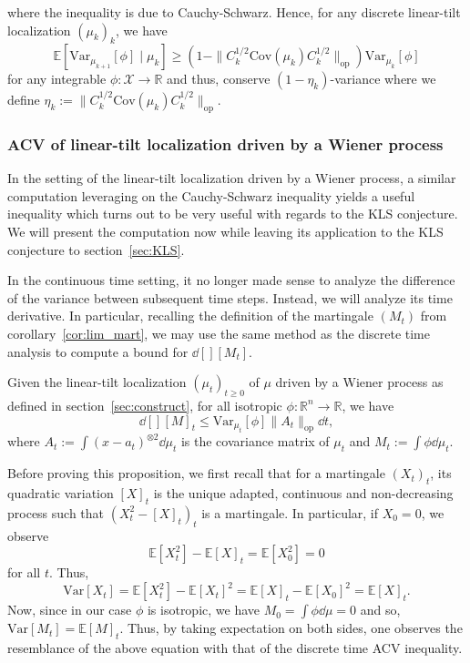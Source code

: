 where the inequality is due to Cauchy-Schwarz. Hence, for any discrete linear-tilt 
localization \((\mu_k)_k\), we have
\begin{equation}\label{eq:linear-tilt_ACV}
  \mathbb{E}[\text{Var}_{\mu_{k + 1}}[\phi] \mid \mu_k] \ge 
    (1 - \|C_k^{1 / 2}\text{Cov}(\mu_k)C_k^{1 / 2}\|_{\text{op}})\text{Var}_{\mu_k}[\phi]
\end{equation}
for any integrable \(\phi : \mathcal{X} \to \mathbb{R}\) and thus, conserve \((1 - \eta_k)\)-variance 
where we define \(\eta_k := \|C_k^{1 / 2}\text{Cov}(\mu_k)C_k^{1 / 2}\|_{\text{op}}\). 

\subsubsection{ACV of linear-tilt localization driven by a Wiener process}

In the setting of the linear-tilt localization driven by a Wiener process, a similar computation 
leveraging on the Cauchy-Schwarz inequality yields a useful inequality which turns out to be very 
useful with regards to the KLS conjecture. We will present the computation now while leaving its application to 
the KLS conjecture to section~\ref{sec:KLS}.

In the continuous time setting, it no longer made sense to analyze the difference of the variance 
between subsequent time steps. Instead, we will analyze its time derivative. In particular, recalling 
the definition of the martingale \((M_t)\) from corollary~\ref{cor:lim_mart}, we may use the same 
method as the discrete time analysis to compute a bound for \(\dd[] [M_t]\).

\begin{proposition}\label{prop:linear-tilt_ACV}
  Given the linear-tilt localization \((\mu_t)_{t \ge 0}\) of \(\mu\) driven by a Wiener process as defined 
  in section~\ref{sec:construct}, for all isotropic \(\phi : \mathbb{R}^n \to \mathbb{R}\), we have 
  \[\dd[] [M]_t \le \text{Var}_{\mu_t}[\phi] \|A_t\|_\text{op} \dd t,\]
  where \(A_t := \int (x - a_t)^{\otimes 2} \dd \mu_t\) is the covariance matrix of \(\mu_t\) and \(M_t := \int \phi \dd \mu_t\).
\end{proposition}

Before proving this proposition, we first recall that for a martingale \((X_t)_t\), its quadratic variation 
\([X]_t\) is the unique adapted, continuous and non-decreasing process such that \((X_t^2 - [X]_t)_t\) 
is a martingale. In particular, if \(X_0 = 0\), we observe 
\[\mathbb{E}[X_t^2] - \mathbb{E}[X]_t = \mathbb{E}[X_0^2] = 0\]
for all \(t\). Thus, 
\[\text{Var}[X_t] = \mathbb{E}[X_t^2] - \mathbb{E}[X_t]^2 = \mathbb{E}[X]_t - \mathbb{E}[X_0]^2 = \mathbb{E}[X]_t.\]
Now, since in our case \(\phi\) is isotropic, we have \(M_0 = \int \phi \dd \mu = 0\) and so,
\(\text{Var}[M_t] = \mathbb{E}[M]_t\). Thus, by taking expectation on both sides, one observes the resemblance 
of the above equation with that of the discrete time ACV inequality. 

